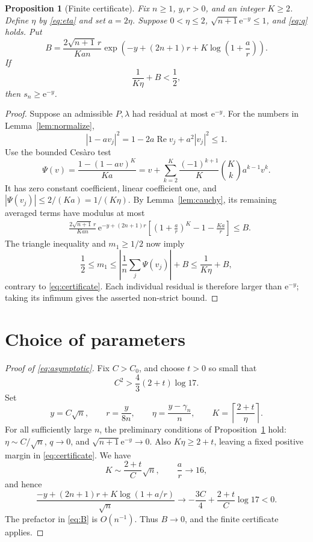 \documentclass[11pt]{article}
\newtheorem{proposition}[theorem]{Proposition}
\theoremstyle{remark}\newtheorem{remark}[theorem]{Remark}
\newcommand{\Rea}{\operatorname{Re}}
\newcommand{\ee}{\mathrm e}
\begin{document}
\begin{proposition}[Finite certificate]\label{prop:certificate}
Fix \(n\ge1\), \(y,r>0\), and an integer \(K\ge2\).
Define \(\eta\) by \eqref{eq:eta} and set \(a=2\eta\).
Suppose \(0<\eta\le2\), \(\sqrt{n+1}\ee^{-y}\le1\), and
\eqref{eq:q} holds. Put
\begin{equation}\label{eq:B}
 B=\frac{2\sqrt{n+1}\,r}{Kan}
       \exp\left(-y+(2n+1)r+
                       K\log\left(1+\frac ar\right)\right).
\end{equation}
If
\begin{equation}\label{eq:certificate}
 \frac1{K\eta}+B<\frac12,
\end{equation}
then \(s_n\ge\ee^{-y}\).
\end{proposition}
\begin{proof}
Suppose an admissible \(P,\lambda\) had residual at most \(\ee^{-y}\).
For the numbers in Lemma~\ref{lem:normalize},
\[
 |1-av_j|^2
 =1-2a\Rea v_j+a^2|v_j|^2\le1.
\]
Use the bounded Ces\`aro test
\begin{equation}\label{eq:test}
 \Psi(v)=\frac{1-(1-av)^K}{Ka}
       =v+\sum_{k=2}^K
          \frac{(-1)^{k+1}}K\binom Kk a^{k-1}v^k.
\end{equation}
It has zero constant coefficient, linear coefficient one, and
\(|\Psi(v_j)|\le2/(Ka)=1/(K\eta)\).
By Lemma~\ref{lem:cauchy}, its remaining averaged terms have modulus
at most
\begin{align*}
 &\frac{2\sqrt{n+1}\,r}{Kan}\,
       \ee^{-y+(2n+1)r}
       \left[\left(1+\frac ar\right)^K-1-\frac{Ka}{r}\right]
 \le B.
\end{align*}
The triangle inequality and \(m_1\ge1/2\) now imply
\[
 \frac12\le m_1\le
       \left|\frac1n\sum_j\Psi(v_j)\right|+B
       \le\frac1{K\eta}+B,
\]
contrary to \eqref{eq:certificate}.
Each individual residual is therefore larger than \(\ee^{-y}\);
taking its infimum gives the asserted non-strict bound.
\end{proof}

\section{Choice of parameters}
\begin{proof}[Proof of \eqref{eq:asymptotic}]
Fix \(C>C_0\), and choose \(t>0\) so small that
\[
 C^2>\frac43(2+t)\log17.
\]
Set
\[
 y=C\sqrt n,\qquad r=\frac{y}{8n},\qquad
 \eta=\frac{y-\gamma_n}{n},\qquad
 K=\left\lceil\frac{2+t}{\eta}\right\rceil.
\]
For all sufficiently large \(n\), the preliminary conditions of
Proposition~\ref{prop:certificate} hold:
\(\eta\sim C/\sqrt n\), \(q\to0\), and
\(\sqrt{n+1}\ee^{-y}\to0\).
Also \(K\eta\ge2+t\), leaving a fixed positive margin in
\eqref{eq:certificate}. We have
\[
 K\sim\frac{2+t}{C}\sqrt n,\qquad \frac ar\to16,
\]
and hence
\[
 \frac{-y+(2n+1)r+K\log(1+a/r)}{\sqrt n}
 \longrightarrow -\frac{3C}{4}+\frac{2+t}{C}\log17<0.
\]
The prefactor in \eqref{eq:B} is \(O(n^{-1})\).
Thus \(B\to0\), and the finite certificate applies.
\end{proof}
\end{document}
